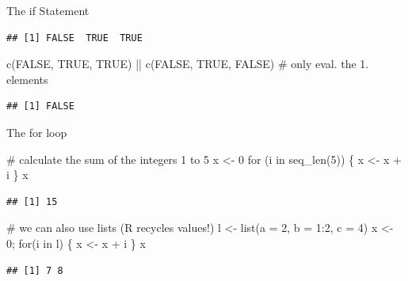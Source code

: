\documentclass[
  9pt,
  ignorenonframetext,
]{beamer}
\newenvironment{Shaded}{\begin{snugshade}}{\end{snugshade}}
\newcommand{\CommentTok}[1]{\textcolor[rgb]{0.50,0.62,0.50}{#1}}
\newcommand{\ControlFlowTok}[1]{\textcolor[rgb]{0.94,0.87,0.69}{#1}}
\newcommand{\DataTypeTok}[1]{\textcolor[rgb]{0.87,0.87,0.75}{#1}}
\newcommand{\DecValTok}[1]{\textcolor[rgb]{0.86,0.86,0.80}{#1}}
\newcommand{\KeywordTok}[1]{\textcolor[rgb]{0.94,0.87,0.69}{#1}}
\newcommand{\NormalTok}[1]{\textcolor[rgb]{0.80,0.80,0.80}{#1}}
\newcommand{\OperatorTok}[1]{\textcolor[rgb]{0.94,0.94,0.82}{#1}}
\newcommand{\OtherTok}[1]{\textcolor[rgb]{0.94,0.94,0.56}{#1}}
\newcommand{\StringTok}[1]{\textcolor[rgb]{0.80,0.58,0.58}{#1}}
\begin{document}
\begin{frame}[fragile]{The if Statement}
\begin{verbatim}
## [1] FALSE  TRUE  TRUE
\end{verbatim}

\begin{Shaded}
\begin{Highlighting}[]
\KeywordTok{c}\NormalTok{(}\OtherTok{FALSE}\NormalTok{, }\OtherTok{TRUE}\NormalTok{, }\OtherTok{TRUE}\NormalTok{) }\OperatorTok{||}\StringTok{ }\KeywordTok{c}\NormalTok{(}\OtherTok{FALSE}\NormalTok{, }\OtherTok{TRUE}\NormalTok{, }\OtherTok{FALSE}\NormalTok{) }\CommentTok{\# only eval. the 1. elements}
\end{Highlighting}
\end{Shaded}

\begin{verbatim}
## [1] FALSE
\end{verbatim}
\end{frame}

\begin{frame}[fragile]{The for loop}
\protect\hypertarget{the-for-loop}{}
\small

\begin{Shaded}
\begin{Highlighting}[]
\CommentTok{\# calculate the sum of the integers 1 to 5}
\NormalTok{x \textless{}{-}}\StringTok{ }\DecValTok{0}
\ControlFlowTok{for}\NormalTok{ (i }\ControlFlowTok{in} \KeywordTok{seq\_len}\NormalTok{(}\DecValTok{5}\NormalTok{)) \{}
\NormalTok{    x \textless{}{-}}\StringTok{ }\NormalTok{x }\OperatorTok{+}\StringTok{ }\NormalTok{i}
\NormalTok{\}}
\NormalTok{x}
\end{Highlighting}
\end{Shaded}

\begin{verbatim}
## [1] 15
\end{verbatim}

\begin{Shaded}
\begin{Highlighting}[]
\CommentTok{\# we can also use lists (R recycles values!)}
\NormalTok{l \textless{}{-}}\StringTok{ }\KeywordTok{list}\NormalTok{(}\DataTypeTok{a =} \DecValTok{2}\NormalTok{, }\DataTypeTok{b =} \DecValTok{1}\OperatorTok{:}\DecValTok{2}\NormalTok{, }\DataTypeTok{c =} \DecValTok{4}\NormalTok{)}
\NormalTok{x \textless{}{-}}\StringTok{ }\DecValTok{0}\NormalTok{; }\ControlFlowTok{for}\NormalTok{(i }\ControlFlowTok{in}\NormalTok{ l) \{ x \textless{}{-}}\StringTok{ }\NormalTok{x }\OperatorTok{+}\StringTok{ }\NormalTok{i \}}
\NormalTok{x}
\end{Highlighting}
\end{Shaded}

\begin{verbatim}
## [1] 7 8
\end{verbatim}
\end{frame}
\end{document}
